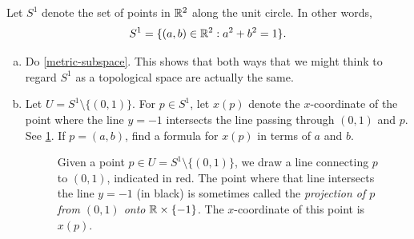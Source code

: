 \begin{exercise}   \label{circle-projection-atlas}
	Let $S^1$ denote the set of points in $\mathbb{R}^2$ along the unit circle. In other words,
	\[ S^1 = \{ (a, b) \in \mathbb{R}^2 : a^2 + b^2 = 1 \}. \]
	\begin{enumerate}[(a)]
		\item Do \cref{metric-subspace}. This shows that both ways that we might think to regard $S^1$ as a topological space are actually the same. 
		
		\item Let $U = S^1 \setminus \{(0,1)\}$. For $p \in S^1$, let $x(p)$ denote the $x$-coordinate of the point where the line $y = -1$ intersects the line passing through $(0,1)$ and $p$. See \cref{circle-projection}. If $p = (a, b)$, find a formula for $x(p)$ in terms of $a$ and $b$. 
		
		\begin{figure}
			\begin{center}
			\end{center}
			\caption{Given a point $p \in U = S^1 \setminus \{(0,1)\}$, we draw a line connecting $p$ to $(0,1)$, indicated in red. The point where that line intersects the line $y = -1$ (in black) is sometimes called the \emph{projection of $p$ from $(0,1)$ onto $\mathbb{R} \times \{-1\}$}. The $x$-coordinate of this point is $x(p)$.}  \label{circle-projection}
		\end{figure}
		

\end{enumerate}
\end{exercise}
